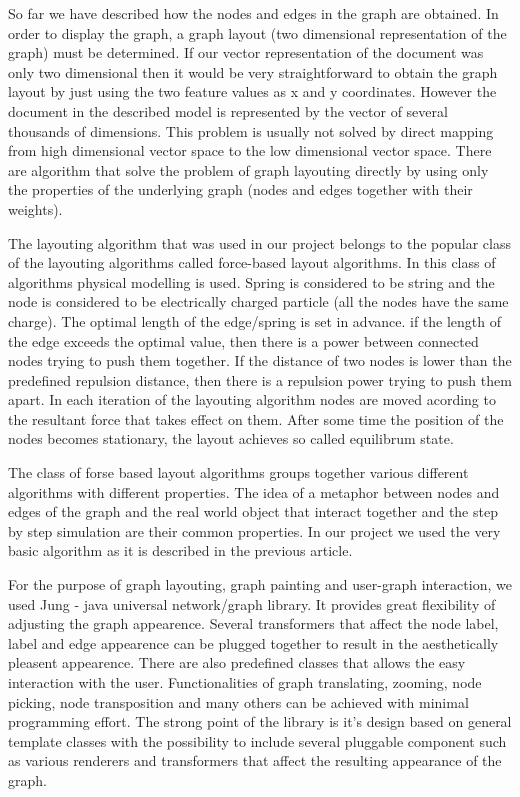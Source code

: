 
So far we have described how the nodes and edges in the graph are obtained. In order to display the graph, a graph layout (two dimensional representation of the graph) must be determined. If our vector representation of the document was only two dimensional then it would be very straightforward to obtain the graph layout
by just using the two feature values as x and y coordinates. However the document in the described model is represented by the vector of several thousands of dimensions. This problem is usually not solved by direct mapping from high dimensional vector space to the low dimensional vector space. There are algorithm that solve the problem of graph layouting directly by using only the properties of the underlying graph (nodes and edges together with their weights).

The layouting algorithm that was used in our project belongs to the popular class of the layouting algorithms called force-based layout algorithms. In this class of algorithms physical modelling is used. Spring is considered to be string and the node is considered to be electrically charged particle (all the nodes have the same charge). The optimal length of the edge/spring is set in advance. if the length of the edge exceeds the optimal value, then there is a power between connected nodes trying to push them together. If the distance of two nodes is lower than the predefined repulsion distance, then there is a repulsion power trying to push them apart. In each iteration of the layouting algorithm nodes are moved acording to the resultant force that takes effect on them. After some time the position of the nodes becomes stationary, the layout achieves so called equilibrum state.

The class of forse based layout algorithms groups together various different algorithms with different properties. The idea of a metaphor between nodes and edges of the graph and the real world object that interact together and the step by step simulation are their common properties. In our project we used the very basic algorithm as it is described in the previous article.

For the purpose of graph layouting, graph painting and user-graph interaction, we used Jung - java universal network/graph library. It provides great flexibility of adjusting the graph appearence. Several transformers that affect the node label, label and edge appearence can be plugged together to result in the aesthetically pleasent appearence. There are also predefined classes that allows the easy interaction with the user. Functionalities of graph translating, zooming, node picking, node transposition and many others can be achieved with minimal programming effort. The strong point of the library is it's design based on general template classes with the possibility to include several pluggable component such as various renderers and transformers that affect the resulting appearance of the graph. 

